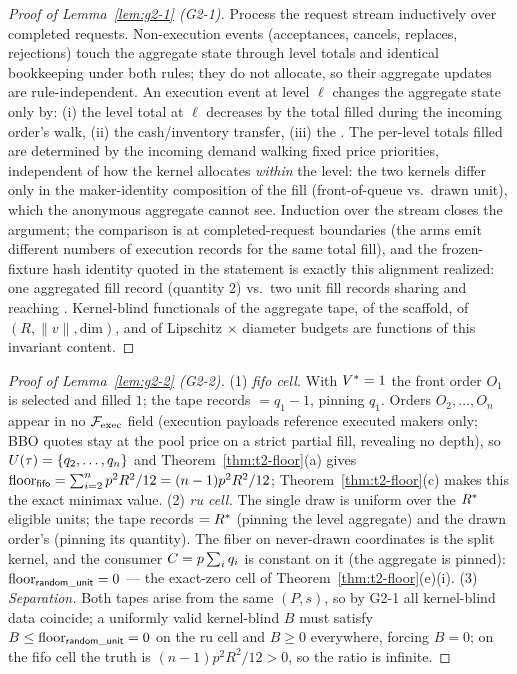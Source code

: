 \begin{proof}[Proof of Lemma~\ref{lem:g2-1} (G2-1)]
Process the request stream inductively over completed requests. Non-execution
events (acceptances, cancels, replaces, rejections) touch the aggregate
state through level totals and identical bookkeeping under both rules; they
do not allocate, so their aggregate updates are rule-independent. An
execution event at level $\ell$ changes the aggregate state only by: (i) the
level total at $\ell$ decreases by the total filled during the incoming
order's walk, (ii) the cash/inventory transfer, (iii) the
. The per-level totals filled are determined by the
incoming demand walking fixed price priorities, independent of how the
kernel allocates \emph{within} the level: the two kernels differ only in the
maker-identity composition of the fill (front-of-queue vs.\ drawn unit),
which the anonymous aggregate cannot see. Induction over the stream closes
the argument; the comparison is at completed-request boundaries (the arms
emit different numbers of execution records for the same total fill), and
the frozen-fixture hash identity quoted in the statement is exactly this
alignment realized: one aggregated fill record (quantity 2) vs.\ two unit
fill records sharing \preagghash{} and reaching \postagghash{}. Kernel-blind
functionals of the aggregate tape, of the scaffold, of $(R, \|v\|,
\mathrm{dim})$, and of Lipschitz $\times$ diameter budgets are functions of
this invariant content.
\end{proof}

\begin{proof}[Proof of Lemma~\ref{lem:g2-2} (G2-2)]
(1) \emph{fifo cell.} With $V^{*} = 1$ the front order $O_1$ is selected
and filled $1$; the tape records  $= q_1 - 1$, pinning
$q_1$. Orders $O_2,\dots,O_n$ appear in no $\mathcal{F}_{\mathrm{exec}}$ field (execution
payloads reference executed makers only; BBO quotes stay at the pool price
on a strict partial fill, revealing no depth), so
$U(\tau) = \{q_2,\dots,q_n\}$ and Theorem~\ref{thm:t2-floor}(a) gives
$\mathrm{floor}_{\mathsf{fifo}} = \sum_{i=2}^{n}p^2R^2/12 = (n-1)p^2R^2/12$;
Theorem~\ref{thm:t2-floor}(c) makes this the exact minimax value.
(2) \emph{ru cell.} The single draw is uniform over the $R^{*}$ eligible
units; the tape records  $= R^{*}$ (pinning the level
aggregate) and the drawn order's  (pinning its
quantity). The fiber on never-drawn coordinates is the split kernel, and the
consumer $C = p\sum_i q_i$ is constant on it (the aggregate is
pinned): $\mathrm{floor}_{\mathsf{random\_unit}} = 0$ --- the exact-zero cell of
Theorem~\ref{thm:t2-floor}(e)(i). (3) \emph{Separation.} Both tapes arise
from the same $(P,s)$, so by G2-1 all kernel-blind data coincide; a
uniformly valid kernel-blind $B$ must satisfy $B \le \mathrm{floor}_{\mathsf{random\_unit}} =
0$ on the ru cell and $B \ge 0$ everywhere, forcing $B = 0$; on the fifo
cell the truth is $(n-1)p^2R^2/12 > 0$, so the ratio is infinite.
\end{proof}

